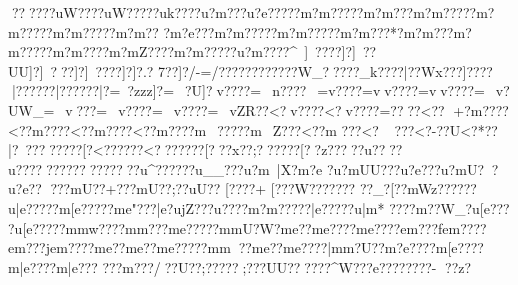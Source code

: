 {{{{{{{{{{{{{{{{{{{{{{{{{{{{{{{{{{{{{{{{{{{{{{{{{{{{{{{{{{{{{{{{{{{{{{{{{{{{{{{{{{{{{{{{{{{{{{{{{{{{{{{{{{{{{{{{{{{{{{{{{{{{{{{{{{{{{{{{{{{{{{{{{{{{{{{{{{{{{{{{{{{{{{{{{{{{{{{{{{{{{{{{{{{{{{{{{{{{{{{{{{{{{{{{{{{{{{{{{{{{{{{{{{{{{{{{{{{{{{{{{{{{{{{{{{{{{{{{{{{{{{{{{{{{{{{{{{{{{{{{{{{{{{{{{{{{{{{{{{{{{{{{{{{{{{{{{{{{{{{{{{{{{{{{{{{{{{{{{{{{{{{{{{{{{{{{{{{{{{{{{{{{{{{{{{{{{{{{{{{{{{{{{{{{{{{{{{{{{{{{{{{{{{{{{{{{{{{{{{{{{{{{{{{{{{{{{{{{{{{{{{{{{{{{{{{{{{{{{{{{{{{{{{{{{{{{{{{{{{{{{{{{{{{{{{{{{{{{{{{{{{{{{{{{{{{{{{{{{{{{{{{{{{{{{{{{{{{{{{{{{{{{{{{{{{{{{{{{{{{{{{{{{{{{{{{{{{{{{{{{{{{{{{{{{{{{{{{{{{{{{{{{{{{{{{{{{{{{{{{{{{{{{{{{{{{{{{{{{{{{{{{{{{{{{{{{{{{{{{{{{{{{{{{{{{{{{{{{{{{{{{{{{{{{{{{{{{{{{{{{{{{{{{{{{{{{{{{{{{{{{{{{{{{{{{{{{{{{{{{{{{{{{{{{{{{{{{{{{{{{{{{{{{{{{{{{{{{{{{{{{{{{{{{{{{{{{{{{{{{{{{{{{{{{{{{{{{{{{{{{{{{{{{{{{{{{{{{{{{{{{{{{{{{{{{{{{{{{{{{{{{{{{{{{{{{{{{{{{{{{{{{{{{{{{{{{{{{{{{{{{{{{{{{{{{{{{{{{{{{{{{{{{{{{{{{{{{{{{{{{{{{{{{{{{{{{{{{{{{{{{{{{{{{{{{{{{{{{{{{{{{{{{{{{{{{{{{{{{{{{{{{{{{{{{{{{{{{{{{{{{{{{{{{{{{{{{{{{{{{{{{{{{{{{{{{{{{{{{{{{{{{{{{{{{{{{{{{{{{{{{{{{{{{{{{{{{{{{{{{{{{{{{{{{{{{{{{{{{{{{{{{{{{{{{{{{{{{{{{{{{{{{{{{{{{{{{{{{{{{{{{{{{ ??}????uW???}?uW????}?uk????u?m???u?e?????m?m?????m?m???m?m?????m?m?????m?m?????m?m??
 ?m?e??  ?m?m?????m?m?????m?m???*?m?m??  ?m?m?????m?m????m?mZ????m?m?????u?m????^~]~????]?]~??UU]?]~???]?]~????]?]?.?
7??]?/-=/????????????W_?????_k????|??Wx???]????|?}?????|?}?????|?=~?zzz]?=~?}U]?v????=~n????~=v????=vv????=vv????=~v?UW_=~v???=~v????=~v????=~vZR??<?v????<?v????\?=????\?<??
+\??m????<??m????<??m????<??m????m~?????m~Z???<??m
???<?~
???\?<?-??U\?<? *??|?\?~???\??????[?<?????{?<????{?\???}[???x??;??????[??z?????u??^^???u??????}???????????u^??????u__???u?m~|X?m?e    ?u?mUU???u?e???u?mU??u?e??
???mU??+???mU?? ;??uU??
[??}??+
[???W?? {?????
 {??_? [??mWz? ??\]???u|e?????m[e?????m{e"???|e?ujZ???u\e????{m?m?????}|e?????u|m*
???}?m??W_?u[e???
?u[e?????m{mw????m{m}???{m{e?????m{mU?W?{m{e??{m{e????{m{e????{e{m???f{e{m????{e{m???j{e{m????{m{e??{m{e??{m{e?????m{m??{m{e??{m{e????|m{m?U??{m?e????m[e??? ?m|e??? ?m|e??? ???m???/??}U?? ;??}???;???UU????}??^W???e ??????}??-	??}z?
}}}}}}}}}}}}}}}}}}}}}}}}}}}}}}}}}}}}}}}}}}}}}}}}}}}}}}}}}}}}}}}}}}}}}}}}}}}}}}}}}}}}}}}}}}}}}}}}}}}}}}}}}}}}}}}}}}}}}}}}}}}}}}}}}}}}}}}}}}}}}}}}}}}}}}}}}}}}}}}}}}}}}}}}}}}}}}}}}}}}}}}}}}}}}}}}}}}}}}}}}}}}}}}}}}}}}}}}}}}}}}}}}}}}}}}}}}}}}}}}}}}}}}}}}}}}}}}}}}}}}}}}}}}}}}}}}}}}}}}}}}}}}}}}}}}}}}}}}}}}}}}}}}}}}}}}}}}}}}}}}}}}}}}}}}}}}}}}}}}}}}}}}}}}}}}}}}}}}}}}}}}}}}}}}}}}}}}}}}}}}}}}}}}}}}}}}}}}}}}}}}}}}}}}}}}}}}}}}}}}}}}}}}}}}}}}}}}}}}}}}}}}}}}}}}}}}}}}}}}}}}}}}}}}}}}}}}}}}}}}}}}}}}}}}}}}}}}}}}}}}}}}}}}}}}}}}}}}}}}}}}}}}}}}}}}}}}}}}}}}}}}}}}}}}}}}}}}}}}}}}}}}}}}}}}}}}}}}}}}}}}}}}}}}}}}}}}}}}}}}}}}}}}}}}}}}}}}}}}}}}}}}}}}}}}}}}}}}}}}}}}}}}}}}}}}}}}}}}}}}}}}}}}}}}}}}}}}}}}}}}}}}}}}}}}}}}}}}}}}}}}}}}}}}}}}}}}}}}}}}}}}}}}}}}}}}}}}}}}}}}}}}}}}}}}}}}}}}}}}}}}}}}}}}}}}}}}}}}}}}}}}}}}}}}}}}}}}}}}}}}}}}}}}}}}}}}}}}}}}}}}}}}}}}}}}}}}}}}}}}}}}}}}}}}}}}}}}}}}}}}}}}}}}}}}}}}}}}}}}}}}}}}}}}}}}}}}}}}}}}}}}}}}}}}}}}}}}}}}}}}}}}}}}}}}}}}}}}}}}}}}}}}}}}}}}}}}}}}}}}}}}}}}}}}}}}}}}}}}}}}}}}}}}}}}}}}}}}}}}}}}}}}}}}}}}}}}}}}}}}}}}}}}}}}}}}}}}}}}}}}}}}}}}}}}}}}}}}}}}}}}}}}}}}}}}}}}}}}}}}}}}}}}}}}}}}}}}}}}}}}}}}}}}}}}}}}}}}}}}}}}}}}}}}}}}}}}}}}}}}}}}}}}}}}}}}}}}}}}}}}}}}}}}}}}}}}}}}}}}}}}}}}}
